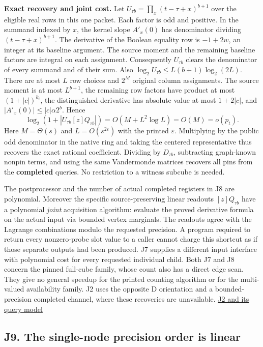 \documentclass[
  11pt,
]{article}
\begin{document}
\textbf{Exact recovery and joint cost.} Let
\(U_{\tau b}=\prod_x(t-\tau+x)^{b+1}\) over the eligible real rows in
this one packet. Each factor is odd and positive. In the summand
indexed by \(x\), the kernel slope \(A'_x(0)\) has denominator dividing
\((t-\tau+x)^{b+1}\). The derivative of the Boolean equality row is
\(-1+2w\), an integer at its baseline argument. The source moment and
the remaining baseline factors are integral on each assignment.
Consequently \(U_{\tau b}\) clears the denominator of every summand
and of their sum. Also
\(\log_2 U_{\tau b}\le L(b+1)\log_2(2L)\). There are at most \(L\) row
choices and \(2^M\) original column assignments. The source moment is at
most \(L^{b+1}\), the remaining row factors have product at most
\((1+|c|)^{k_t}\), the distinguished derivative has absolute value at
most \(1+2|c|\), and \(|A'_x(0)|\le |c|\alpha 2^b\). Hence \[
  \log_2\!\left(1+\left|U_{\tau b}[z]Q_{\tau b}\right|\right)
          =O(M+L^2\log L)=O(M)=o(p_t).
\] Here \(M=\Theta(s)\) and \(L=O(s^{2\varepsilon})\) with the printed
\(\varepsilon\). Multiplying by the public odd denominator in the native
ring and taking the centered representative thus recovers the exact
rational coefficient. Dividing by \(D_{\tau b}\), subtracting
graph-known nonpin terms, and using the same Vandermonde matrices
recovers all pins from the \textbf{completed} queries. No restriction to
a witness subcube is needed.

The postprocessor and the number of actual completed registers in J8 are
polynomial. Moreover the specific source-preserving linear readouts
\([z]Q_{\tau b}\) have a polynomial \emph{joint} acquisition algorithm:
evaluate the proved derivative formula on the actual input via bounded
vertex marginals. The readouts agree with the Lagrange combinations
modulo the requested precision. A program required to return every
nonzero-probe slot value to a caller cannot charge this shortcut as if
those separate outputs had been produced. J7 supplies a different input
interface with polynomial cost for every requested individual child.
Both J7 and J8 concern the pinned full-cube family, whose count also has
a direct edge scan. They give no general speedup for the printed
counting algorithm or for the multi-valued availability family. J2 uses
the opposite D orientation and a bounded-precision completed channel,
where these recoveries are unavailable.
\hyperref[v9-section-joint-algorithms]{J2 and its query model}

\subsection{J9. The single-node precision order is
linear}\label{v9-j9-the-single-node-precision-order-is-linear}
\end{document}
